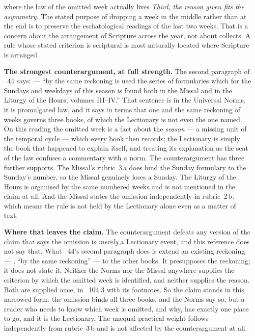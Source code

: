 \begin{synthesis}{where the law of the omitted week actually lives}
\emph{Third, the reason given fits the asymmetry.} The stated purpose of dropping a week in the
middle rather than at the end is to preserve the eschatological readings of the last two weeks. That
is a concern about the arrangement of Scripture across the year, not about collects. A rule whose
stated criterion is scriptural is most naturally located where Scripture is arranged.

\textbf{The strongest counterargument, at full strength.} The second paragraph of ~44 says:
 --- ``by the same reckoning is used
the series of formularies which for the Sundays and weekdays of this season is found both in the
Missal and in the Liturgy of the Hours, volumes III--IV.'' That sentence is in the Universal Norms,
it is promulgated law, and it says in terms that one and the same reckoning of weeks governs three
books, of which the Lectionary is not even the one named. On this reading the omitted week is a fact
about the \emph{season} --- a missing unit of the temporal cycle --- which every book then records;
the Lectionary is simply the book that happened to explain itself, and treating its explanation as
the seat of the law confuses a commentary with a norm. The counterargument has three further
supports. The Missal's rubric~3\,a does bind the Sunday formulary to the Sunday's number, so the
Missal genuinely loses a Sunday. The Liturgy of the Hours is organised by the same numbered weeks
and is not mentioned in the claim at all. And the Missal states the omission independently in
rubric~2\,b, which means the rule is not held by the Lectionary alone even as a matter of text.

\textbf{Where that leaves the claim.} The counterargument defeats any version of the claim that says
the omission is \emph{merely} a Lectionary event, and this reference does not say that. What
~44's second paragraph does is extend an existing reckoning --- ,
``by the same reckoning'' --- to the other books. It presupposes the reckoning; it does not state it.
Neither the Norms nor the Missal anywhere supplies the criterion by which the omitted week is
identified, and neither supplies the reason. Both are supplied once, in ~104.3 with its
footnotes. So the claim stands in this narrowed form: the omission binds all three books, and the
Norms say so; but a reader who needs to know which week is omitted, and why, has exactly one place to
go, and it is the Lectionary. The unequal practical weight follows independently from rubric~3\,b and
is not affected by the counterargument at all.


\end{synthesis}
